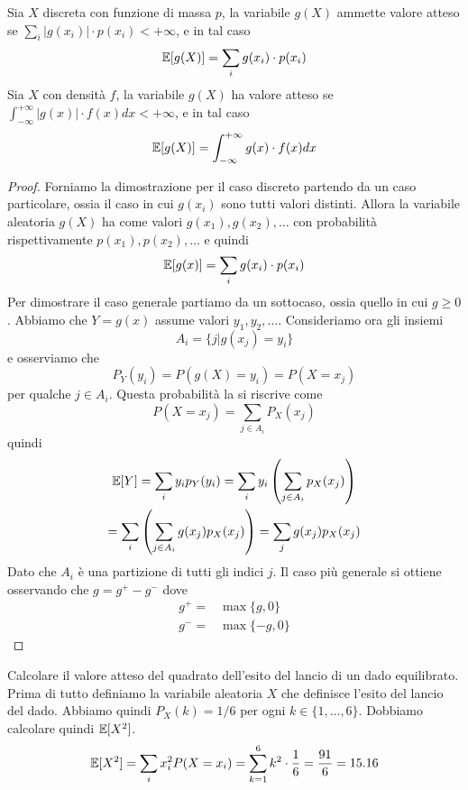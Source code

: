 \begin{proposition}
	Sia $X$ discreta con funzione di massa $p$, la variabile $g(X)$ ammette valore atteso se
	$\sum_i |g(x_i)| \cdot p(x_i) < +\infty$, e in tal caso
	\[ \mathbb{E}[g(X)] = \sum_i g(x_i) \cdot p(x_i) \]
	Sia $X$ con densità $f$, la variabile $g(X)$ ha valore atteso se
	$\int_{-\infty}^{+\infty} |g(x)| \cdot f(x) dx < +\infty$, e in tal caso
	\[ \mathbb{E}[g(X)] = \int_{-\infty}^{+\infty} g(x) \cdot f(x) dx \]
	\begin{proof}
		Forniamo la dimostrazione per il caso discreto partendo da un caso particolare, ossia il
		caso in cui $g(x_i)$ sono tutti valori distinti. Allora la variabile aleatoria $g(X)$ ha
		come valori $g(x_1), g(x_2), \dots$ con probabilità rispettivamente $p(x_1), p(x_2), \dots$
		e quindi
		\[ \mathbb{E}[g(x)] = \sum_i g(x_i) \cdot p(x_i) \]
		Per dimostrare il caso generale partiamo da un sottocaso, ossia quello in cui $g \geq 0$.
		Abbiamo che $Y = g(x)$ assume valori $y_1, y_2, \dots$. Consideriamo ora gli insiemi
		\[ A_i = \{ j | g(x_j) = y_i \} \]
		e osserviamo che
		\[ P_Y(y_i) = P(g(X) = y_i) = P(X = x_j) \]
		per qualche $j \in A_i$. Questa probabilità la si riscrive come
		\[ P(X = x_j) = \sum_{j \in A_i} P_X (x_j) \]
		quindi
		\begin{multline*}
			\mathbb{E}[Y] = \sum_i y_i p_Y(y_i) = \sum_i y_i \left( \sum_{j \in A_i} p_X(x_j) \right) \\
			= \sum_i \left( \sum_{j \in A_i} g(x_j) p_X (x_j) \right) = \sum_j g(x_j) p_X (x_j)
		\end{multline*}
		Dato che $A_i$ è una partizione di tutti gli indici $j$. Il caso più generale si ottiene
		osservando che $g = g^+ - g^-$ dove
		\begin{align*}
			g^+ = & \max \{g,0\} \\
			g^- = & \max\{-g,0\}
		\end{align*}
	\end{proof}
\end{proposition}

\begin{example}
	Calcolare il valore atteso del quadrato dell'esito del lancio di un dado equilibrato. Prima di
	tutto definiamo la variabile aleatoria $X$ che definisce l'esito del lancio del dado. Abbiamo
	quindi $P_X(k) = 1/6$ per ogni $k \in \{1, \dots, 6\}$. Dobbiamo calcolare quindi $\mathbb{E}[X^2]$.
	\[
		\mathbb{E}[X^2] = \sum_i x_i^2 P(X = x_i) = \sum_{k=1}^6 k^2 \cdot \frac{1}{6}
		= \frac{91}{6} = 15.16
	\]
\end{example}

